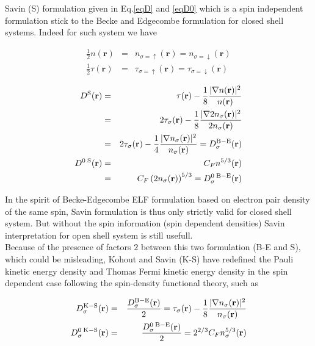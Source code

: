 \documentclass[a4paper,12pt]{report}
\begin{document}
Savin (S) formulation given in Eq.\ref{eqD} and \ref{eqD0} which is a spin independent formulation stick to the Becke and Edgecombe formulation for closed shell systems. Indeed for such system we have

\begin{eqnarray}
\frac{1}{2} n(\mathbf{r}) &=& n_{\sigma=\uparrow}(\mathbf{r}) = n_{\sigma=\downarrow}(\mathbf{r}) \\
\frac{1}{2} \tau(\mathbf{r}) &=& \tau_{\sigma=\uparrow}(\mathbf{r}) = \tau_{\sigma=\downarrow}(\mathbf{r})
\end{eqnarray}

\begin{eqnarray}
D^{\rm{S}}(\mathbf{r}) &=& \tau(\mathbf{r}) - \frac{1}{8} \frac{\vert \nabla n(\mathbf{r}) \vert^2}{n(\mathbf{r})} \nonumber\\
                       &=& 2\tau_{\sigma}(\mathbf{r}) - \frac{1}{8} \frac{\vert \nabla 2 n_{\sigma}(\mathbf{r}) \vert^2}{2 n_{\sigma}(\mathbf{r})} \nonumber\\
                       &=& 2\tau_{\sigma}(\mathbf{r}) - \frac{1}{4} \frac{\vert \nabla  n_{\sigma}(\mathbf{r}) \vert^2}{n_{\sigma}(\mathbf{r})} = D_{\sigma}^{\rm{B-E}}(\mathbf{r}) \\
D^{0\;\rm{S}}(\mathbf{r}) &=& C_F n^{5/3}(\mathbf{r}) \nonumber\\
                          &=& C_F \left(2 n_{\sigma}(\mathbf{r})\right)^{5/3} = D_{\sigma}^{0\;\rm{B-E}}(\mathbf{r})
\end{eqnarray}

In the spirit of Becke-Edgecombe ELF formulation based on electron pair density of the same spin, Savin formulation is thus only strictly valid for closed shell system. But without the spin information (spin dependent densities) Savin interpretation for open shell system is still usefull.\\
Because of the presence of factors $2$ between this two formulation (B-E and S), which could be misleading, Kohout and Savin (K-S) have redefined the Pauli kinetic energy density and Thomas Fermi kinetic energy density in the spin dependent case\cite{Kohout_96} following the spin-density functional theory, such as 

\begin{eqnarray}
D_{\sigma}^{\rm{K-S}}(\mathbf{r}) &=& \frac{D_{\sigma}^{\rm{B-E}}(\mathbf{r})}{2} = \tau_{\sigma}(\mathbf{r}) - \frac{1}{8} \frac{\vert \nabla n_{\sigma}(\mathbf{r}) \vert^2}{n_{\sigma}(\mathbf{r})}\\
D_{\sigma}^{0\;\rm{K-S}}(\mathbf{r}) &=& \frac{D_{\sigma}^{0\;\rm{B-E}}(\mathbf{r})}{2} = 2^{2/3} C_F n_{\sigma}^{5/3}(\mathbf{r})
\end{eqnarray}
\end{document}
